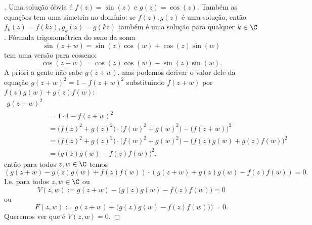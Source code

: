 \pnove*
\begin{proof}[]

Uma solução óbvia é $f(z) = \sin(z)$ e $g(z) =\cos(z)$.
Também as equações tem uma simetria no domínio:
se $f(z),g(z)$ é uma solução, então $f_k(z) = f(kz), g_k(z) = g(kz)$
também é uma solução para qualquer $k\in\C$.
Fórmula trigonométrica do seno da soma
\[ \sin(z+w) = \sin(z) \cos(w) + \cos(z) \sin(w) \]
tem uma versão para cosseno:
\[ \cos(z+w) = \cos(z)\cos(w) - \sin(z)\sin(w). \]
A priori a gente não sabe $g(z+w)$, mas podemos derivar o valor dele
da equação $g(z+w)^2 = 1 - f(z+w)^2$ substituindo $f(z+w)$
por $f(z)g(w)+g(z)f(w)$:
\begin{align*}
g(z+w)^2 
\\ &= 1\cdot 1 - f(z+w)^2
\\ &= \big(f(z)^2+g(z)^2\big)\cdot\big(f(w)^2+g(w)^2\big) - \big(f(z+w)\big)^2
\\ &= \big(f(z)^2+g(z)^2\big)\cdot\big(f(w)^2+g(w)^2\big) - \big(f(z)g(w)+g(z)f(w)\big)^2
\\ &= \big(g(z)g(w)-f(z)f(w)\big)^2,
\end{align*}
então para todos $z,w\in\C$ temos
\[ (g(z+w)-g(z)g(w)+f(z)f(w)) \cdot (g(z+w) + g(z)g(w)-f(z)f(w)) = 0. \]
I.e. para todos $z,w\in\C$ ou
\[ V(z,w) := g(z+w) - \big(g(z)g(w) - f(z)f(w)\big) = 0 \]
ou 
\[ F(z,w) := g(z+w) + \big(g(z)g(w)-f(z)f(w))\big) = 0. \]
Queremos ver que é $V(z,w)=0$.

\end{proof}


